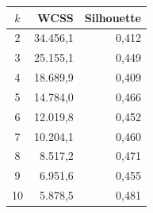 \begin{tabular}{crr}
\toprule
$k$ & WCSS & Silhouette \\
\midrule
2 & 34.456,1 & 0,412 \\
3 & 25.155,1 & 0,449 \\
4 & 18.689,9 & 0,409 \\
5 & 14.784,0 & 0,466 \\
6 & 12.019,8 & 0,452 \\
7 & 10.204,1 & 0,460 \\
8 & 8.517,2 & 0,471 \\
9 & 6.951,6 & 0,455 \\
10 & 5.878,5 & 0,481 \\
\bottomrule
\end{tabular}
